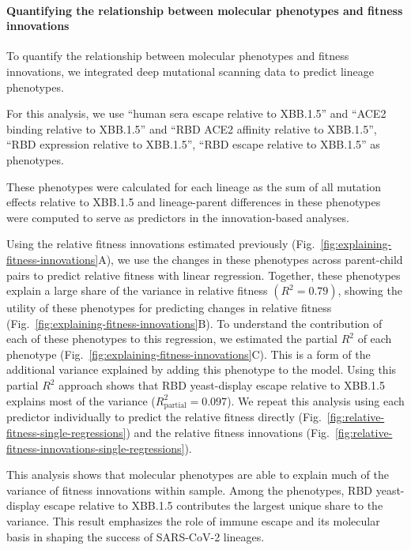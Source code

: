 \paragraph{Quantifying the relationship between molecular phenotypes and fitness innovations}

To quantify the relationship between molecular phenotypes and fitness innovations, we integrated deep mutational scanning data to predict lineage phenotypes.

For this analysis, we use ``human sera escape relative to XBB.1.5'' and ``ACE2 binding relative to XBB.1.5'' \cite{Dadonaite2023} and ``RBD ACE2 affinity relative to XBB.1.5'', ``RBD expression relative to XBB.1.5'', ``RBD escape relative to XBB.1.5'' \cite{Taylor2023} as phenotypes.

These phenotypes were calculated for each lineage as the sum of all mutation effects relative to XBB.1.5 and lineage-parent differences in these phenotypes were computed to serve as predictors in the innovation-based analyses.

Using the relative fitness innovations estimated previously (Fig.~\ref{fig:explaining-fitness-innovations}A), we use the changes in these phenotypes across parent-child pairs to predict relative fitness with linear regression.
Together, these phenotypes explain a large share of the variance in relative fitness $(R^2=0.79)$, showing the utility of these phenotypes for predicting changes in relative fitness (Fig.~\ref{fig:explaining-fitness-innovations}B).
To understand the contribution of each of these phenotypes to this regression, we estimated the partial $R^2$ of each phenotype (Fig.~\ref{fig:explaining-fitness-innovations}C).
This is a form of the additional variance explained by adding this phenotype to the model.
Using this partial $R^2$ approach shows that RBD yeast-display escape relative to XBB.1.5 explains most of the variance ($R^2_{\text{partial}} = 0.097$).
We repeat this analysis using each predictor individually to predict the relative fitness directly (Fig.~\ref{fig:relative-fitness-single-regressions}) and the relative fitness innovations (Fig.~\ref{fig:relative-fitness-innovations-single-regressions}).

This analysis shows that molecular phenotypes are able to explain much of the variance of fitness innovations within sample.
Among the phenotypes, RBD yeast-display escape relative to XBB.1.5 contributes the largest unique share to the variance. 
This result emphasizes the role of immune escape and its molecular basis in shaping the success of SARS-CoV-2 lineages.

